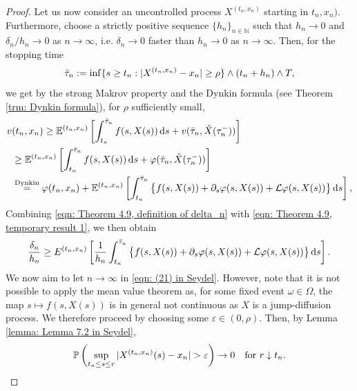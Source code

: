 \begin{proof}
    Let us now consider an uncontrolled process $X^{(t_n,x_n)}$ starting in $t_n,x_n)$. Furthermore, choose a strictly positive sequence $\{h_n\}_{n \in \mathbb N}$ such that $h_n \rightarrow 0$ and $\delta_n / h_n \rightarrow 0$ as $n \rightarrow \infty$, i.e. $\delta_n \rightarrow 0$ faster than $h_n \rightarrow 0$ as $n \rightarrow \infty$. Then, for the stopping time
    \begin{equation*}
        \Bar{\tau}_n := \inf \{ s \geq t_n : |X^{(t_n,x_n)} - x_n| \geq \rho\} \wedge (t_n + h_n) \wedge T,
    \end{equation*}
    we get by the strong Makrov property and the Dynkin formula (see Theorem \ref{trm: Dynkin formula}), for $\rho$ sufficiently small,
    \begin{align}
        v & (t_n,x_n) \geq \mathbb{E}^{(t_n,x_n)} \left[ \int_{t_n}^{\Bar{\tau}_n} f(s,X(s)) \,\mathrm{d} s + v (\bar \tau_n, \check{X}(\tau_n^-)) \right] \nonumber \\
        & \geq \mathbb{E}^{(t_n,x_n)} \left[ \int_{t_n}^{\Bar{\tau}_n} f(s,X(s)) \,\mathrm{d} s + \varphi(\bar \tau_n, \check{X}(\tau_n^-)) \right] \nonumber \\
        & \overset{\text{Dynkin}}{=} \varphi(t_n,x_n) + \mathbb{E}^{(t_n,x_n)} \left[ \int_{t_n}^{\bar \tau_n} \big\{ f(s,X(s)) + \partial_s\varphi(s,X(s)) + \mathcal L \varphi(s,X(s)) \big\} \,\mathrm{d} s \right],
        \label{eqn: Theorem 4.9, temporary result 1}
    \end{align}
    Combining \eqref{eqn: Theorem 4.9, definition of delta_n} with \eqref{eqn: Theorem 4.9, temporary result 1}, we then obtain 
    \begin{equation}
        \frac{\delta_n}{h_n} \geq E^{(t_n,x_n)} \left[ \frac{1}{h_n} \int_{t_n}^{\Bar{\tau}_n} \big\{ f(s,X(s)) + \partial_s \varphi(s,X(s)) + \mathcal{L} \varphi(s,X(s)) \big\} \,\mathrm{d} s \right].
        \label{eqn: (21) in Seydel}
    \end{equation}
    We now aim to let $n \rightarrow \infty$ in \eqref{eqn: (21) in Seydel}. However, note that it is not possible to apply the mean value theorem as, for some fixed event $\omega \in \Omega$, the map $s \mapsto f(s,X(s))$  is in general not continuous as $X$ is a jump-diffusion process. We therefore proceed by choosing some $\varepsilon \in (0, \rho)$. Then, by Lemma \ref{lemma: Lemma 7.2 in Seydel},
    \begin{equation*}
        \Prob \left( \sup_{t_n \leq s \leq r} |X^{(t_n,x_n)}(s) - x_n| > \varepsilon \right) \rightarrow 0 \quad \text{for } r \downarrow t_n. 

\end{equation*}
\end{proof}
